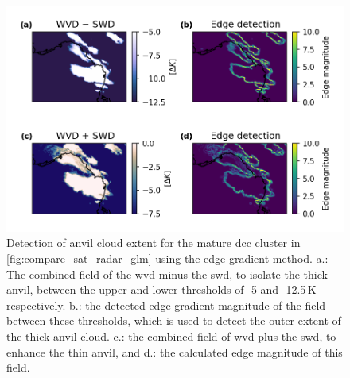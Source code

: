 \begin{figure}[t]
    \includegraphics[width=\textwidth]{figures/chapter1_17.png}
    \caption[
    Detection of anvil cloud extent for the mature \acrshort{dcc} cluster in \ref{fig:compare_sat_radar_glm} using the edge gradient method
    ]{
    Detection of anvil cloud extent for the mature \acrshort{dcc} cluster in \ref{fig:compare_sat_radar_glm} using the edge gradient method. a.: The combined field of the \acrshort{wvd} minus the \acrshort{swd}, to isolate the thick anvil, between the upper and lower thresholds of -5 and -12.5\,\unit{K} respectively. b.: the detected edge gradient magnitude of the field between these thresholds, which is used to detect the outer extent of the thick anvil cloud. c.: the combined field of \acrshort{wvd} plus the \acrshort{swd}, to enhance the thin anvil, and d.: the calculated edge magnitude of this field.
    }
    \label{fig:edge_detection}
\end{figure}

